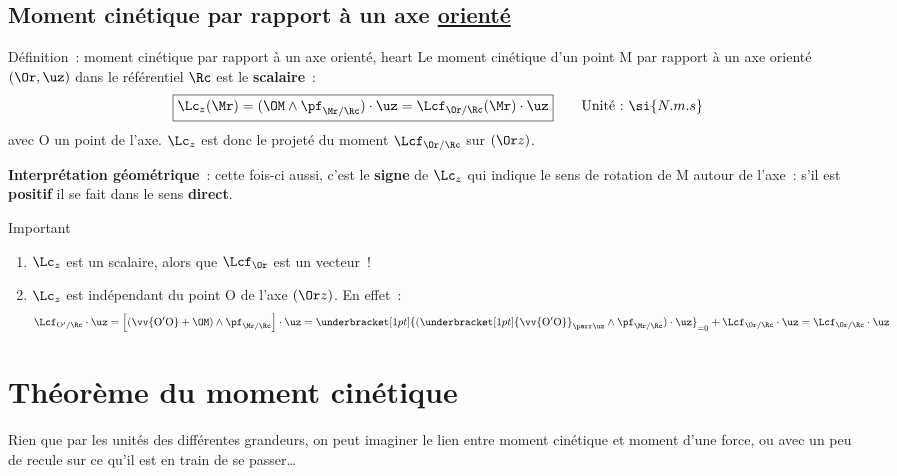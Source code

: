 \documentclass[../main/main.tex]{subfiles}
\begin{document}
\subsection{Moment cinétique par rapport à un axe \ul{orienté}}
\begin{tdefi}{Définition~: moment cinétique par rapport à un axe orienté, heart}
    Le moment cinétique d'un point M par rapport à un axe orienté $(\Or,\uz)$
    dans le référentiel $\Rc$ est le \textbf{scalaire}~:
    \[
        \boxed{\Lc_z(\Mr) = (\OM\wedge\pf_{\Mr/\Rc})\cdot\uz =
            \Lcf_{\Or/\Rc}(\Mr)\cdot\uz}
        \qquad
        \text{Unité~:~}
        \si{N.m.s}
    \]
    avec O un point de l'axe. $\Lc_z$ est donc le projeté du moment
    $\Lcf_{\Or/\Rc}$ sur $(\Or z)$.
\end{tdefi}

\textbf{Interprétation géométrique}~: cette fois-ci aussi, c'est le
\textbf{signe} de $\Lc_z$ qui indique le sens de rotation de M autour de l'axe~:
s'il est \textbf{positif} il se fait dans le sens \textbf{direct}.

\begin{rimpo}{Important}
    \begin{enumerate}
        \item $\Lc_z$ est un scalaire, alors que $\Lcf_{\Or}$ est un vecteur~!
        \item $\Lc_z$ est indépendant du point O de l'axe $(\Or z)$. En effet~:
            \[
                \Lcf_{\mathrm{O'}/\Rc}\cdot\uz =
                \left[(\vv{\rm O'O}+\OM)\wedge\pf_{\Mr/\Rc}\right]\cdot\uz =
                \underbracket[1pt]{
                (\underbracket[1pt]{\vv{\rm O'O}}_{\parr\uz}\wedge\pf_{\Mr/\Rc})
                \cdot\uz}_{=0}
                + \Lcf_{\Or/\Rc}\cdot\uz = \Lcf_{\Or/\Rc}\cdot\uz 
            \]
    \end{enumerate}
    \vspace*{-30pt}
\end{rimpo}

\section{Théorème du moment cinétique}
Rien que par les unités des différentes grandeurs, on peut imaginer le lien
entre moment cinétique et moment d'une force, ou avec un peu de recule sur ce
qu'il est en train de se passer…
\end{document}

